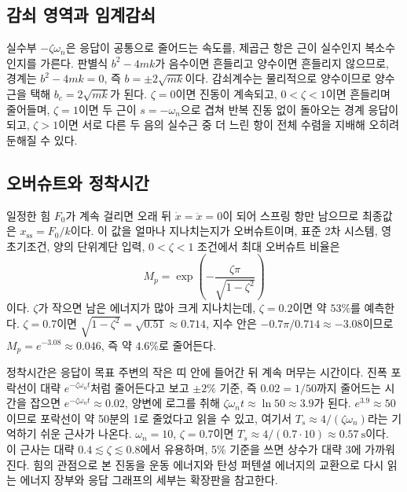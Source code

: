 \subsection{감쇠 영역과 임계감쇠}

실수부 $-\zeta\omega_n$은 응답이 공통으로 줄어드는 속도를, 제곱근 항은 근이 실수인지
복소수인지를 가른다.
판별식 $b^2-4mk$가 음수이면 흔들리고 양수이면 흔들리지 않으므로, 경계는
$b^2-4mk=0$, 즉 $b=\pm2\sqrt{mk}$이다.
감쇠계수는 물리적으로 양수이므로 양수 근을 택해 $b_c=2\sqrt{mk}$가 된다.
$\zeta=0$이면 진동이 계속되고, $0<\zeta<1$이면 흔들리며 줄어들며, $\zeta=1$이면 두 근이
$s=-\omega_n$으로 겹쳐 반복 진동 없이 돌아오는 경계 응답이 되고, $\zeta>1$이면 서로 다른
두 음의 실수근 중 더 느린 항이 전체 수렴을 지배해 오히려 둔해질 수 있다.

\subsection{오버슈트와 정착시간}

일정한 힘 $F_0$가 계속 걸리면 오래 뒤 $\dot{x}=\ddot{x}=0$이 되어 스프링 항만 남으므로
최종값은 $x_{\mathrm{ss}}=F_0/k$이다.
이 값을 얼마나 지나치는지가 오버슈트이며, 표준 2차 시스템, 영 초기조건, 양의 단위계단
입력, $0<\zeta<1$ 조건에서 최대 오버슈트 비율은
\begin{equation}
  M_p=\exp\!\left(-\frac{\zeta\pi}{\sqrt{1-\zeta^2}}\right)
  \label{eq:u3m-overshoot}
\end{equation}
이다.
$\zeta$가 작으면 남은 에너지가 많아 크게 지나치는데, $\zeta=0.2$이면 약 $53\%$를
예측한다.
$\zeta=0.7$이면 $\sqrt{1-\zeta^2}=\sqrt{0.51}\approx0.714$, 지수 안은
$-0.7\pi/0.714\approx-3.08$이므로 $M_p=e^{-3.08}\approx0.046$, 즉 약 $4.6\%$로 줄어든다.

정착시간은 응답이 목표 주변의 작은 띠 안에 들어간 뒤 계속 머무는 시간이다.
진폭 포락선이 대략 $e^{-\zeta\omega_n t}$처럼 줄어든다고 보고 $\pm2\%$ 기준, 즉
$0.02=1/50$까지 줄어드는 시간을 잡으면 $e^{-\zeta\omega_n t}\approx0.02$, 양변에 로그를
취해 $\zeta\omega_n t\approx\ln 50\approx3.9$가 된다.
$e^{3.9}\approx50$이므로 포락선이 약 50분의 1로 줄었다고 읽을 수 있고, 여기서
$T_s\approx 4/(\zeta\omega_n)$라는 기억하기 쉬운 근사가 나온다.
$\omega_n=10$, $\zeta=0.7$이면 $T_s\approx4/(0.7\cdot10)\approx0.57~\mathrm{s}$이다.
이 근사는 대략 $0.4\lesssim\zeta\lesssim0.8$에서 유용하며, 5\% 기준을 쓰면 상수가 대략
3에 가까워진다.
힘의 관점으로 본 진동을 운동 에너지와 탄성 퍼텐셜 에너지의 교환으로 다시 읽는 에너지
장부와 응답 그래프의 세부는 확장판을 참고한다.

